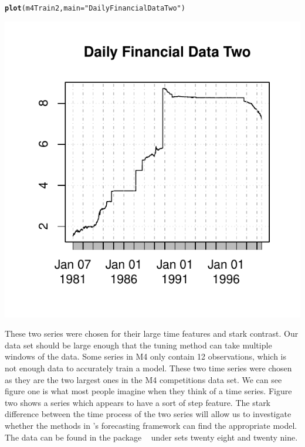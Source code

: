 \documentclass[article]{jss}\usepackage[]{graphicx}\usepackage[]{color}
\makeatletter
\def\maxwidth{ %
  \ifdim\Gin@nat@width>\linewidth
    \linewidth
  \else
    \Gin@nat@width
  \fi
}
\newcommand{\hlstr}[1]{\textcolor[rgb]{0.192,0.494,0.8}{#1}}%
\newcommand{\hlstd}[1]{\textcolor[rgb]{0.345,0.345,0.345}{#1}}%
\newcommand{\hlkwc}[1]{\textcolor[rgb]{0.333,0.667,0.333}{#1}}%
\newcommand{\hlkwd}[1]{\textcolor[rgb]{0.737,0.353,0.396}{\textbf{#1}}}%
\newenvironment{kframe}{%
 \def\at@end@of@kframe{}%
 \ifinner\ifhmode%
  \def\at@end@of@kframe{\end{minipage}}%
  \begin{minipage}{\columnwidth}%
 \fi\fi%
 \def\FrameCommand##1{\hskip\@totalleftmargin \hskip-\fboxsep
 \colorbox{shadecolor}{##1}\hskip-\fboxsep
     \hskip-\linewidth \hskip-\@totalleftmargin \hskip\columnwidth}%
 \MakeFramed {\advance\hsize-\width
   \@totalleftmargin\z@ \linewidth\hsize
   \@setminipage}}%
 {\par\unskip\endMakeFramed%
 \at@end@of@kframe}
\newenvironment{knitrout}{}{} %
\makeatother
\begin{document}
\begin{knitrout}
{}


\begin{kframe}\begin{alltt}
\hlkwd{plot}\hlstd{(m4Train2,} \hlkwc{main} \hlstd{=} \hlstr{"Daily Financial Data Two"}\hlstd{)}
\end{alltt}
\end{kframe}

{\centering \includegraphics[width=\maxwidth]{figure/get_dat-2} 

}



\end{knitrout}

These two series were chosen for their large time features and stark contrast. Our data set should be large enough that the tuning method can take multiple windows of the data. Some series in M4 only contain 12 observations, which is not enough data to accurately train a model. These two time series were chosen as they are the two largest ones in the M4 competitions data set. We can see figure one is what most people imagine when they think of a time series. Figure two shows a series which appears to have a sort of step feature. The stark difference between the time process of the two series will allow us to investigate whether the methods in 's forecasting framework can find the appropriate model. The data can be found in the package  ~\cite{m4comp} under sets twenty eight and twenty nine. 


\clearpage


\end{document}
